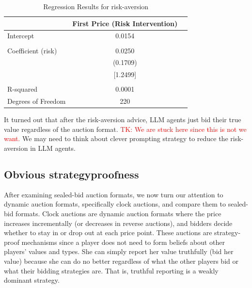\documentclass{article} %
\newcommand{\TK}[1]{\textcolor{red}{TK: #1}}
\begin{document}
\begin{table}[htbp]
\centering
\begin{tabular}{lcc}
\hline
 & First Price (Risk Intervention)  \\
\hline
Intercept & 0.0154 \\
 & & \\
Coefficient (risk) & 0.0250\\
 & (0.1709)  \\
 & [1.2499] \\
 & & \\
R-squared & 0.0001 \\
Degrees of Freedom &220\\
\hline
\end{tabular}
\caption{Regression Results for risk-aversion}
\label{tab:regression_results_risk}
\end{table}

It turned out that after the risk-aversion advice, LLM agents just bid their true value regardless of the auction format. \TK{We are stuck here since this is not we want.}  We may need to think about clever prompting strategy to reduce the risk-aversion in LLM agents.






\subsection{Obvious strategyproofness}\label{session:OSP}

After examining sealed-bid auction formats, we now turn our attention to dynamic auction formats, specifically clock auctions, and compare them to sealed-bid formats. 
Clock auctions are dynamic auction formats where the price increases incrementally (or decreases in reverse auctions), and bidders decide whether to stay in or drop out at each price point.
These auctions are strategy-proof mechanisms since a player does not need to form beliefs about other players’ values and types. 
She can simply report her value truthfully (bid her value) because she can do no better regardless of what the other players bid or what their bidding strategies are. That is, truthful reporting is a weakly dominant strategy. 
\end{document}
